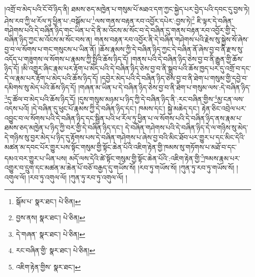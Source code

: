 །འགྲོ་བ་མེད་པའི་ངོ་བོ་ཉིད་ནི། ཐམས་ཅད་མཁྱེན་པ་གསུམ་པོ་མཐའ་དག་ཀྱང་སྐྱེད་པར་བྱེད་པའི་དབང་དུ་བྱས་ཏེ། ཤེས་རབ་ཀྱི་ཕ་རོལ་ཏུ་ཕྱིན་པ་:བསྒོམ་པ་\footnote{སྒོམ་པ་  སྣར་ཐང་།  པེ་ཅིན། }ལས་གནས་བརྟན་རབ་འབྱོར་དཔེར་:བྱས་ཏེ།\footnote{བྱས་ནས།  སྣར་ཐང་།  པེ་ཅིན། } ཇི་ལྟར་དེ་བཞིན་གཤེགས་པའི་དེ་བཞིན་ཉིད་གང་ཡིན་པ་དེ་ནི་མ་འོངས་མ་སོང་བ་དེ་བཞིན་དུ་གནས་བརྟན་རབ་འབྱོར་གྱི་དེ་བཞིན་ཉིད་ཀྱང་མ་འོངས་མ་སོང་བས་ན། གནས་བརྟན་རབ་འབྱོར་ནི་དེ་བཞིན་གཤེགས་པའི་རྗེས་སུ་སྐྱེས་སོ་ཞེས་བྱ་བ་ལ་སོགས་པ་གང་གསུངས་པ་ཡིན་ནོ། །ཆོས་རྣམས་ཀྱི་དེ་བཞིན་ཉིད་ཀྱང་དེ་བཞིན་ནོ་ཞེས་བྱ་བ་ནི་རྫས་སུ་འདོད་པ་གཟུགས་ལ་སོགས་པ་རྣམས་ཀྱི་སྤྱིའི་ཆོས་ཉིད་དོ། །གནས་པའི་དེ་བཞིན་ཉིད་ཅེས་བྱ་བ་ནི་རྒྱུན་གྱི་ཆོས་ཉིད་དོ། །མི་འགྱུར་ཞིང་རྣམ་པར་རྟོག་པ་མེད་པའི་དེ་བཞིན་ཉིད་ཅེས་བྱ་བ་ནི་སྒྲུབ་པའི་ཆོས་ཁྱད་པར་དུ་འགྲོ་བ་དང་དེ་ལ་རྣམ་པར་རྟོག་པ་མེད་པའི་ཆོས་ཉིད་དོ། །དབྱེར་མེད་པའི་དེ་བཞིན་ཉིད་ཅེས་བྱ་བ་ནི་ཐེག་པ་གསུམ་གྱི་དབྱེ་བ་དམིགས་སུ་མེད་པའི་ཆོས་ཉིད་དོ། །གཞན་མ་ཡིན་པ་དེ་བཞིན་ཉིད་ཅེས་བྱ་བ་ནི་ཐེག་པ་གསུམ་ལས་:དེ་བཞིན་ཉིད་\footnote{དེ་གཞན་  སྣར་ཐང་།  པེ་ཅིན། }དུ་ཚོལ་བ་མེད་པའི་ཆོས་ཉིད་དོ། །དུས་གསུམ་མཉམ་པ་ཉིད་ཀྱི་དེ་བཞིན་ཉིད་ནི་:རང་བཞིན་གྱིས་\footnote{རང་བཞིན་གྱི་  སྣར་ཐང་།  པེ་ཅིན། }མྱ་ངན་ལས་འདས་པའོ། །དེ་བཞིན་དུ་ཕུང་པོ་རྣམས་ཀྱི་དེ་བཞིན་ཉིད་དང་། ཁམས་དང་། སྐྱེ་མཆེད་དང་། རྟེན་ཅིང་འབྲེལ་པར་འབྱུང་བ་ལ་སོགས་པའི་དེ་བཞིན་ཉིད་དང་སྦྱིན་པའི་ཕ་རོལ་ཏུ་ཕྱིན་པ་ལ་སོགས་པའི་དེ་བཞིན་ཉིད་ནས་རྣམ་པ་ཐམས་ཅད་མཁྱེན་པ་ཉིད་ཀྱི་བར་གྱི་དེ་བཞིན་ཉིད་དང་། དེ་བཞིན་གཤེགས་པའི་དེ་བཞིན་ཉིད་དེ་ལ་གཉིས་སུ་མེད་དེ་གཉིས་སུ་བྱར་མེད་པ་ཉིད་དུ་རྟོགས་པས་དེ་བཞིན་གཤེགས་པ་ཞེས་བྱ་བའི་མིང་ཐོབ་པར་གྱུར་པ་དང་མིང་དེའི་མཚན་མ་དབང་པོར་གྱུར་པས་སྟོང་གསུམ་གྱི་སྟོང་ཆེན་པོའི་འཇིག་རྟེན་གྱི་ཁམས་སུ་གཏོགས་པ་མཐོ་བ་དང་དམའ་བར་གྱུར་པ་ཡིན་པས། མདོ་ལས་དེའི་ཚེ་སྟོང་གསུམ་གྱི་སྟོང་ཆེན་པོའི་:འཇིག་རྟེན་གྱི་\footnote{འཇིག་རྟེན་གྱིས་  སྣར་ཐང་། }ཁམས་རྣམ་པར་འགྱུར་བ་དྲུག་དང་མཚན་མ་ཆེན་པོ་བཅོ་བརྒྱད་དུ་གཡོས་སོ། །རབ་ཏུ་གཡོས་སོ། །ཀུན་ཏུ་རབ་ཏུ་གཡོས་སོ། །འགུལ་ལོ། །རབ་ཏུ་འགུལ་ལོ། །ཀུན་ཏུ་རབ་ཏུ་འགུལ་ལོ། །
